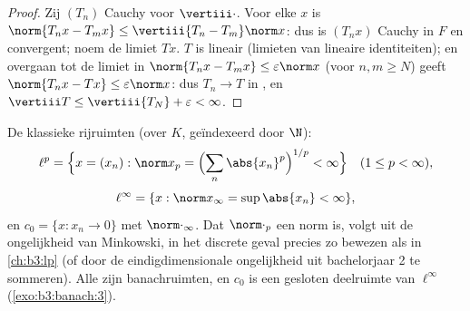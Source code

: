 \begin{proof}
Zij $(T_n)$ Cauchy voor $\vertiii\cdot$. Voor elke $x$ is
$\norm{T_nx - T_mx} \leq \vertiii{T_n - T_m}\norm x$: dus is
$(T_nx)$ Cauchy in $F$ en convergent; noem de limiet $Tx$. $T$ is
lineair (limieten van lineaire identiteiten); en overgaan tot de
limiet in $\norm{T_nx - T_mx} \leq \varepsilon\norm x$ (voor $n, m
\geq N$) geeft $\norm{T_nx - Tx} \leq \varepsilon\norm x$: dus
$T_n \to T$ in , en $\vertiii T \leq \vertiii{T_N} +
\varepsilon < \infty$.
\end{proof}

\begin{definition}\label{def:b3:banach:lp}
De klassieke rijruimten (over $K$,
geïndexeerd door $\N$):
\[
\ell^p = \Bigl\{x = (x_n) : \norm x_p = \Bigl(\sum_n
\abs{x_n}^p\Bigr)^{1/p} < \infty\Bigr\}\quad (1 \leq p <
\infty),
\]
\[
\ell^\infty = \{x : \norm x_\infty = \sup\abs{x_n} < \infty\},
\]
en $c_0 = \{x : x_n \to 0\}$ met $\norm\cdot_\infty$. Dat
$\norm\cdot_p$ een norm is, volgt uit de ongelijkheid van
Minkowski, in het discrete geval precies zo bewezen als in
\cref{ch:b3:lp} (of door de eindigdimensionale ongelijkheid uit
bachelorjaar 2 te sommeren). Alle zijn banachruimten, en $c_0$ is
een gesloten deelruimte van $\ell^\infty$
(\cref{exo:b3:banach:3}).
\end{definition}

